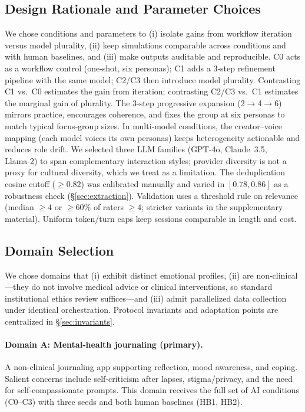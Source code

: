 \documentclass[acmsmall]{acmart}
\begin{document}
\subsection{Design Rationale and Parameter Choices}
\label{sec:design-rationale}
We chose conditions and parameters to (i) isolate gains from workflow iteration versus model plurality, (ii) keep simulations comparable across conditions and with human baselines, and (iii) make outputs auditable and reproducible. C0 acts as a workflow control (one‑shot, six personas); C1 adds a 3‑step refinement pipeline with the same model; C2/C3 then introduce model plurality. Contrasting C1 vs.\ C0 estimates the gain from iteration; contrasting C2/C3 vs.\ C1 estimates the marginal gain of plurality. The 3‑step progressive expansion (2$\rightarrow$4$\rightarrow$6) mirrors practice, encourages coherence, and fixes the group at six personas to match typical focus‑group sizes. In multi‑model conditions, the creator–voice mapping (each model voices its own personas) keeps heterogeneity actionable and reduces role drift. We selected three LLM families (GPT‑4o, Claude~3.5, Llama‑2) to span complementary interaction styles; provider diversity is not a proxy for cultural diversity, which we treat as a limitation. The deduplication cosine cutoff ($\geq 0.82$) was calibrated manually and varied in $[0.78,0.86]$ as a robustness check (\S\ref{sec:extraction}). Validation uses a threshold rule on relevance (median $\geq 4$ or $\geq 60\%$ of raters $\geq 4$; stricter variants in the supplementary material). Uniform token/turn caps keep sessions comparable in length and cost.

\subsection{Domain Selection}
\label{sec:domains}
We chose domains that (i) exhibit distinct emotional profiles, (ii) are non‑clinical---they do not involve medical advice or clinical interventions, so standard institutional ethics review suffices---and (iii) admit parallelized data collection under identical orchestration. Protocol invariants and adaptation points are centralized in \S\ref{sec:invariants}.

\paragraph{Domain A: Mental‑health journaling (primary).}
A non‑clinical journaling app supporting reflection, mood awareness, and coping. Salient concerns include self‑criticism after lapses, stigma/privacy, and the need for self‑compassionate prompts. This domain receives the full set of AI conditions (C0--C3) with three seeds and both human baselines (HB1, HB2).
\end{document}
